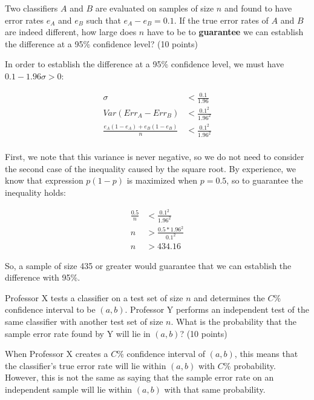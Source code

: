 \documentclass[fleqn]{homework}
\begin{document}
  \begin{problem}{2}
    \begin{question}
      Two classifiers $A$ and $B$ are evaluated on samples of size $n$ and found
      to have error rates $e_A$ and $e_B$ such that $e_A - e_B = 0.1$.  If the
      true error rates of $A$ and $B$ are indeed different, how large does $n$
      have to be to \textbf{guarantee} we can establish the difference at a 95\%
      confidence level? (10 points)
    \end{question}

    In order to establish the difference at a 95\% confidence level, we must
    have $0.1 - 1.96\sigma > 0$:

    \begin{align}
      \sigma &< \frac{0.1}{1.96} \\
      Var(Err_A - Err_B) &< \frac{0.1^2}{1.96^2} \\
      \frac{e_A(1-e_A) + e_B(1-e_B)}{n} &< \frac{0.1^2}{1.96^2} \\ 
    \end{align}

    First, we note that this variance is never negative, so we do not need to
    consider the second case of the inequality caused by the square root.  By
    experience, we know that expression $p(1-p)$ is maximized when $p=0.5$, so
    to guarantee the inequality holds:

    \begin{align}
      \frac{0.5}{n} &< \frac{0.1^2}{1.96^2} \\
      n &> \frac{0.5 * 1.96^2}{0.1^2} \\
      n &> 434.16
    \end{align}
  \end{problem}

  So, a sample of size 435 or greater would guarantee that we can establish the
  difference with 95\%.

  \begin{problem}{3}
    \begin{question}
      Professor X tests a classifier on a test set of size $n$ and determines
      the $C\%$ confidence interval to be $(a,b)$.  Professor Y performs an
      independent test of the same classifier with another test set of size $n$.
      What is the probability that the sample error rate found by Y will lie in
      $(a,b)$? (10 points)
    \end{question}

    When Professor X creates a $C\%$ confidence interval of $(a,b)$, this means
    that the classifier's true error rate will lie within $(a,b)$ with $C\%$
    probability.  However, this is not the same as saying that the sample error
    rate on an independent sample will lie within $(a,b)$ with that same
    probability.
  \end{problem}
\end{document}
